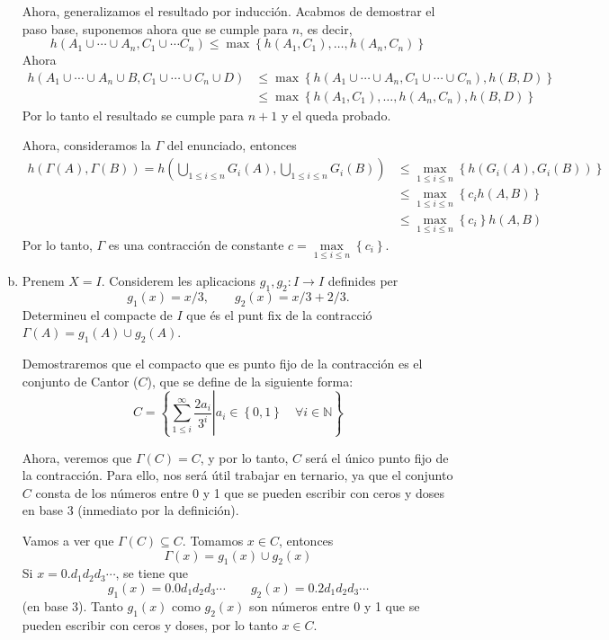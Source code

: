 \documentclass[12pt]{article}
\newcommand{\n}{\mathbb{N}}
\newcommand\setb[1]{\left\{#1\right\}}
\theoremstyle{break}
\begin{document}
\begin{enumerate}[a)]
	Ahora, generalizamos el resultado por inducción. Acabmos de
	demostrar el paso base, suponemos ahora que se cumple para
	$n$, es decir,
	\[
		h(A_1 \cup \cdots \cup A_n, C_1 \cup \cdots C_n) \leq \max
		\setb{ h\left( A_1, C_1 \right), \dots, h\left( A_n, C_n
		\right)}
	\]
	Ahora
	\[
		\begin{aligned} 
			h\left( A_1 \cup \cdots \cup A_n \cup B, C_1 \cup \cdots
			\cup C_n \cup D \right) &\leq \max \setb{ h\left( A_1
					\cup \cdots \cup A_n, C_1 \cup \cdots \cup C_n
			\right), h(B, D)} \\ &\leq \max \setb{ h\left( A_1,
				C_1 \right), \dots, h\left( A_n, C_n \right), h(B,
			D)}
		\end{aligned}
	\]
	Por lo tanto el resultado se cumple para $n+1$ y el queda
	probado.

	Ahora, consideramos la $\Gamma$ del enunciado, entonces
	\[
		\begin{aligned}
			h\left( \Gamma(A), \Gamma(B) \right) =
			h\left( \bigcup_{1 \leq i \leq n} G_i(A), \bigcup_{1
			\leq i \leq n} G_i(B) \right)
			&\leq \max_{1 \leq i \leq n} \setb{ h\left( G_i(A), G_i(B) \right)} \\
			&\leq \max_{1 \leq i \leq n} \setb{ c_i h(A, B) } \\
			&\leq \max_{1 \leq i \leq n} \setb{ c_i } h(A, B)
		\end{aligned}
	\]
	Por lo tanto, $\Gamma$ es una contracción de constante $c = \max\limits_{1 \leq i \leq n} \setb{c_i}$.

\item Prenem $X = I$. Considerem les aplicacions
	$g_1, g_2 \colon I \to I$ definides per
	\[
		g_1(x) = x/3, \qquad g_2(x) = x/3 + 2/3.
	\]
	Determineu el compacte de $I$ que és el punt fix de la
	contracció $\Gamma(A) = g_1(A) \cup g_2(A)$.
	
	\quad

	Demostraremos que el compacto que es punto fijo de la
	contracción es el conjunto de Cantor ($C$), que se define de la
	siguiente forma:
	\[
		C = \setb{\left. \sum^\infty_{1 \leq i} \frac{2a_i}{3^i} \right\vert a_i \in \setb{0, 1} \quad \forall i \in \n}
	\]

	Ahora, veremos que $\Gamma(C) = C$, y por lo tanto, $C$ será el único punto fijo de la contracción. Para ello, nos será útil
	trabajar en ternario, ya que el conjunto $C$ consta de los números entre 0 y 1 que se pueden escribir con ceros y doses en base 3 
	(inmediato por la definición).

	Vamos a ver que $\Gamma(C) \subseteq C$. Tomamos $x \in C$, entonces
	\[
		\Gamma(x) = g_1(x) \cup g_2(x)
	\]
	Si $x = 0.d_1d_2d_3\cdots$, se tiene que
	\[
		g_1(x) = 0.0d_1d_2d_3\cdots \qquad g_2(x) = 0.2d_1d_2d_3\cdots
	\]
	(en base 3). Tanto $g_1(x)$ como $g_2(x)$ son números entre 0 y 1 que se pueden escribir con ceros y doses, por lo tanto $x \in C$.


\end{enumerate}
\end{document}
